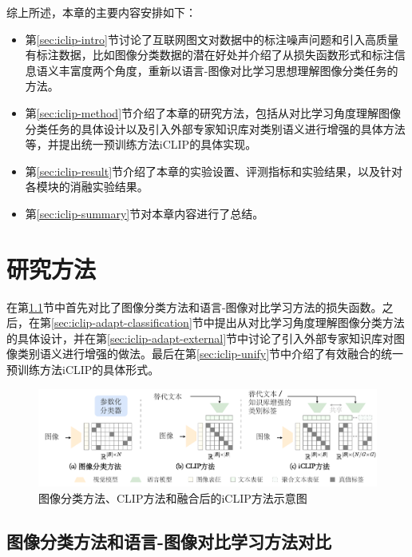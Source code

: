 综上所述，本章的主要内容安排如下：
\begin{itemize}
    \item 第\ref{sec:iclip-intro}节讨论了互联网图文对数据中的标注噪声问题和引入高质量有标注数据，比如图像分类数据的潜在好处并介绍了从损失函数形式和标注信息语义丰富度两个角度，重新以语言-图像对比学习思想理解图像分类任务的方法。
    \item 第\ref{sec:iclip-method}节介绍了本章的研究方法，包括从对比学习角度理解图像分类任务的具体设计以及引入外部专家知识库对类别语义进行增强的具体方法等，并提出统一预训练方法iCLIP的具体实现。
    \item 第\ref{sec:iclip-result}节介绍了本章的实验设置、评测指标和实验结果，以及针对各模块的消融实验结果。
    \item 第\ref{sec:iclip-summary}节对本章内容进行了总结。
\end{itemize}

\section{研究方法}
在第\ref{sec:iclip-compare}节中首先对比了图像分类方法和语言-图像对比学习方法的损失函数。之后，在第\ref{sec:iclip-adapt-classification}节中提出从对比学习角度理解图像分类方法的具体设计，并在第\ref{sec:iclip-adapt-external}节中讨论了引入外部专家知识库对图像类别语义进行增强的做法。最后在第\ref{sec:iclip-unify}节中介绍了有效融合的统一预训练方法iCLIP的具体形式。

\label{sec:iclip-method}
\begin{figure}
  \centering
  \includegraphics[width=1.0\linewidth]{figures/iclip-compare.pdf}
  \caption{图像分类方法、CLIP方法和融合后的iCLIP方法示意图}
  \label{fig:iclip-compare}
\end{figure}
\subsection{图像分类方法和语言-图像对比学习方法对比}
\label{sec:iclip-compare}
